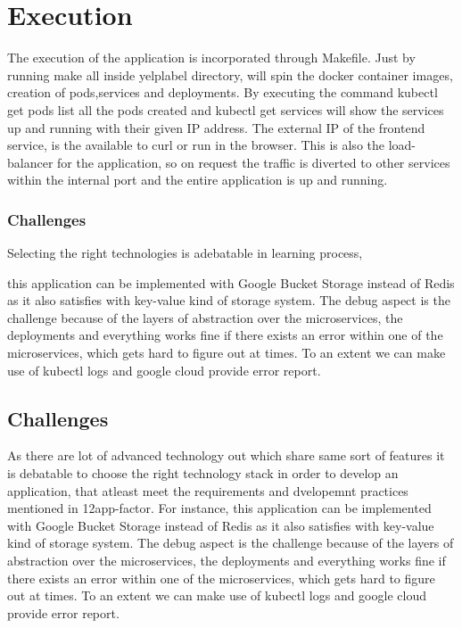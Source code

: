 \section{Execution}

The execution of the application is incorporated through
Makefile. Just by running make all inside yelplabel directory, will
spin the docker container images, creation of pods,services and
deployments. By executing the command kubectl get pods list all the
pods created and kubectl get services will show the services up and
running with their given IP address. The external IP of the frontend
service, is the available to curl or run in the browser. This is also
the load-balancer for the application, so on request the traffic is
diverted to other services within the internal port and the entire
application is up and running.
  
\subsubsection{Challenges} 


Selecting the right technologies is adebatable in learning process,


this application can be implemented with Google Bucket Storage instead
of Redis as it also satisfies with key-value kind of storage
system. The debug aspect is the challenge because of the layers of
abstraction over the microservices, the deployments and everything
works fine if there exists an error within one of the microservices,
which gets hard to figure out at times. To an extent we can make use
of kubectl logs and google cloud provide error report.


\subsection{Challenges}


As there are lot of advanced technology out which share same sort of
features it is debatable to choose the right technology stack in order
to develop an application, that atleast meet the requirements and
dvelopemnt practices mentioned in 12app-factor. For instance, this
application can be implemented with Google Bucket Storage instead of
Redis as it also satisfies with key-value kind of storage system.  The
debug aspect is the challenge because of the layers of abstraction
over the microservices, the deployments and everything works fine if
there exists an error within one of the microservices, which gets hard
to figure out at times. To an extent we can make use of kubectl logs
and google cloud provide error report.
  
